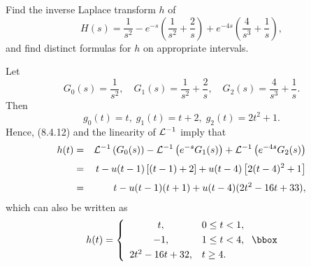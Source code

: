 \setcounter{example}{6}
\begin{example}
  \label{example:8.4.7}\rm Find the inverse Laplace transform $h$ of
  \[
    H(s)=\frac{1}{s^{2}}-e^{-s}\left(\frac{1}{s^{2}}+\frac{2}{s}\right)+ e^{-4s}\left(\frac{4}{s^{3}}+\frac{1}{s}\right),
  \]
  and find distinct formulas for $h$ on appropriate intervals.
\end{example}
\begin{examplesolution}
\solution Let
\[
  G_{0}(s)=\frac{1}{s^{2}},\quad G_{1}(s)=\frac{1}{s^{2}}+\frac{2}{s},\quad G_{2}(s)=\frac{4}{s^{3}}+\frac{1}{s}.
\]
Then
\[
  g_{0}(t)=t,\;g_{1}(t)=t+2,\;g_{2}(t)=2t^{2}+1.
\]
Hence, \textup{(8.4.12)} and the linearity of ${\cal L}^{-1}$ imply that
\begin{eqnarray*}
  h(t) & = & {\cal L}^{-1}\left(G_{0}(s)\right)-{\cal L}^{-1}\left(e^{-s}G_{1}(s)\right)+{\cal L}^{-1}\left(e^{-4s}G_{2}(s)\right) \\[1\jot]
       & = & t-u(t-1)\left[(t-1)+2\right]+u(t-4)\left[2(t-4)^{2}+1\right]                                                          \\[1\jot]
       & = & t-u(t-1)(t+1)+u(t-4)(2t^{2}-16t+33),
\end{eqnarray*}
which can also be written as
\[
  h(t)=\left\{
  \begin{array}{cl}
    t,             & 0\le t<1, \\[1\jot]
    -1,            & 1\le t<4, \\[1\jot]
    2t^{2}-16t+32, & t\ge4.
  \end{array}\right.\bbox
\]
\end{examplesolution}

